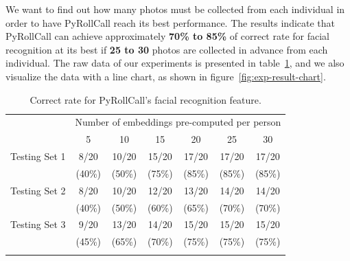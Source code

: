 We want to find out how many photos must be collected from each individual in order to have PyRollCall reach its best performance.
The results indicate that PyRollCall can achieve approximately \textbf{70\% to 85\%} of correct rate for facial recognition at its best
if \textbf{25 to 30} photos are collected in advance from each individual.
The raw data of our experiments is presented in table~\ref{tab:exp-result-tab},
and we also visualize the data with a line chart, as shown in figure~\ref{fig:exp-result-chart}.
\vspace{0.3cm}

\begin{table}[!htb]
\centering
\caption{Correct rate for PyRollCall's facial recognition feature.} 
\begin{tabular}{@{}lcccccc@{}}
\toprule[2pt]
& \multicolumn{6}{c}{Number of embeddings pre-computed per person}                                                                                                               \\ \addlinespace[0.5em]
              & 5                          & 10                         & 15                         & 20                         & 25                         & 30                         \\ \midrule \addlinespace[0.5em]
Testing Set 1 & 8/20                       & 10/20                      & 15/20                      & 17/20                      & 17/20                      & 17/20                      \\
              & \multicolumn{1}{c}{(40\%)} & \multicolumn{1}{c}{(50\%)} & \multicolumn{1}{c}{(75\%)} & \multicolumn{1}{c}{(85\%)} & \multicolumn{1}{c}{(85\%)} & \multicolumn{1}{c}{(85\%)} \\ \addlinespace[0.5em] \midrule \addlinespace[0.5em]
Testing Set 2 & 8/20                       & 10/20                      & 12/20                      & 13/20                      & 14/20                      & 14/20                      \\
              & \multicolumn{1}{c}{(40\%)} & \multicolumn{1}{c}{(50\%)} & \multicolumn{1}{c}{(60\%)} & \multicolumn{1}{c}{(65\%)} & \multicolumn{1}{c}{(70\%)} & \multicolumn{1}{c}{(70\%)} \\ \addlinespace[0.5em] \midrule \addlinespace[0.5em]
Testing Set 3 & 9/20                       & 13/20                      & 14/20                      & 15/20                      & 15/20                      & 15/20                      \\
              & \multicolumn{1}{c}{(45\%)} & \multicolumn{1}{c}{(65\%)} & \multicolumn{1}{c}{(70\%)} & \multicolumn{1}{c}{(75\%)} & \multicolumn{1}{c}{(75\%)} & \multicolumn{1}{c}{(75\%)} \\ \addlinespace[0.5em]
\bottomrule[2pt]
\end{tabular}
\label{tab:exp-result-tab}
\end{table}
\vspace{0.2cm}

